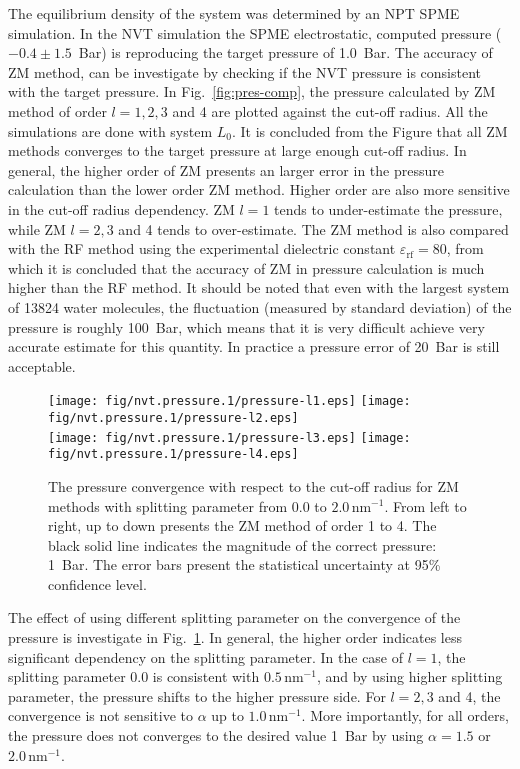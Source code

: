 \documentclass[aip,jcp,a4paper,preprint,unsortedaddress,onecolumn,fleqn]{revtex4-1}
\newcommand{\systemla}{L_0}
\begin{document}
The equilibrium density of the system was determined by an NPT SPME
simulation.  In the NVT simulation the SPME electrostatic, computed
pressure ($-0.4\pm 1.5$~Bar) is reproducing the target pressure of
1.0~Bar.  The accuracy of ZM method, can be investigate by checking if
the NVT pressure is consistent with the target pressure.  In
Fig.~\ref{fig:pres-comp}, the pressure calculated by ZM method of
order $l=1,2,3$ and 4 are plotted against the cut-off radius.
All the  simulations are done with system $\systemla$.
It is concluded from the Figure that all ZM methods converges to the
target pressure at large enough cut-off radius.
In general, the higher order of ZM presents an larger error in the pressure calculation than
the lower order ZM method.
Higher order are also more sensitive in the  cut-off radius dependency.
ZM $l=1$ tends to under-estimate the pressure, while ZM $l=2,3$ and 4 tends to over-estimate.
The ZM method is also compared with
the RF method using the experimental dielectric constant $\varepsilon_{\textrm{rf}} = 80$, 
from which it is concluded that the accuracy of ZM in pressure calculation is much higher
than the RF method.
It should be noted that even with the largest system of 13824 water molecules,
the fluctuation (measured by standard deviation) of the pressure is roughly 100~Bar, which means that it is
very difficult achieve very accurate estimate for this quantity. In practice a pressure error of 20~Bar is
still acceptable. 

\begin{figure}
  \centering
  \texttt{[image: fig/nvt.pressure.1/pressure-l1.eps]}
  \texttt{[image: fig/nvt.pressure.1/pressure-l2.eps]}\\
  \texttt{[image: fig/nvt.pressure.1/pressure-l3.eps]}
  \texttt{[image: fig/nvt.pressure.1/pressure-l4.eps]}
  \caption{The pressure convergence with respect to the cut-off radius
    for ZM methods with  splitting parameter from $0.0$ to $2.0\,\textrm{nm}^{-1}$.
    From left to right, up to down presents the ZM method of order 1 to 4.
    The black solid line indicates the magnitude  of the correct pressure: 1~Bar.
    The error bars present the statistical uncertainty at 95\% confidence level.
  }
  \label{fig:pres-l1}
\end{figure}

The effect of using different splitting parameter on the convergence
of the pressure is investigate in Fig.~\ref{fig:pres-l1}.
In general, the higher order indicates less significant dependency on the splitting parameter.
In the case of $l=1$, the splitting parameter 0.0 is consistent with  $0.5\,\textrm{nm}^{-1}$, and
by using higher splitting parameter, the pressure shifts to the higher pressure side.
For $l=2,3$ and 4, the convergence is not sensitive to $\alpha$ up to  $1.0\,\textrm{nm}^{-1}$.
More importantly, for all orders,
the pressure does not converges to the desired value 1~Bar by using $\alpha = 1.5$ or $2.0\,\textrm{nm}^{-1}$.
\end{document}
